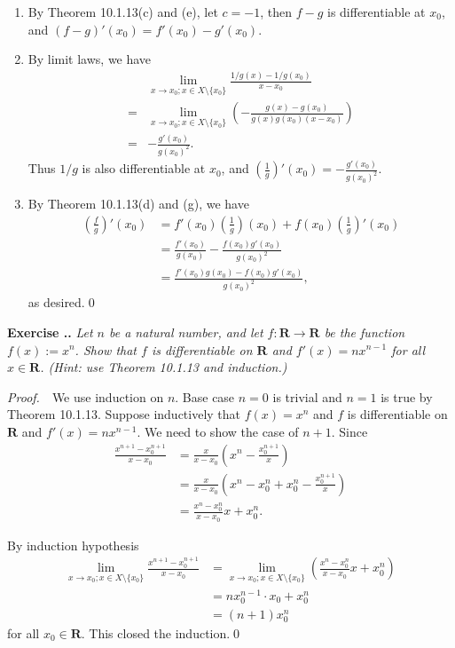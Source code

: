 \documentclass{book}
\newcommand{\pff}{\vspace{.25em}\noindent\emph{Proof.}~~}
\newcounter{Exercise}[section]
\renewcommand{\theExercise}{\thesection.\arabic{Exercise}.}
\newcommand{\new}{\vspace{1.5em}\noindent\textbf{{Exercise \stepcounter{Exercise}\textbf{\theExercise}}} }
\begin{document}
\begin{enumerate}
    \item By Theorem 10.1.13(c) and (e), let $c=-1$, then $f-g$ is differentiable at $x_0$, and $(f-g)'(x_0)=f'(x_0)-g'(x_0)$.
    
    \item By limit laws, we have
        \begin{align*}
            &\lim_{x\to x_0;x\in X\setminus\{x_0\}}\frac{1/g(x)-1/g(x_0)}{x-x_0}\\
            =&\lim_{x\to x_0;x\in X\setminus\{x_0\}}\left(-\frac{g(x)-g(x_0)}{g(x)g(x_0)(x-x_0)}\right)\\
            =&-\frac{g'(x_0)}{g(x_0)^2}.
        \end{align*}
    Thus $1/g$ is also differentiable at $x_0$, and $(\frac{1}{g})'(x_0)=-\frac{g'(x_0)}{g(x_0)^2}$.

    \item By Theorem 10.1.13(d) and (g), we have
        \begin{align*}
            \left(\frac{f}{g}\right)'(x_0)
            &=f'(x_0)\left(\frac{1}{g}\right)(x_0)+f(x_0)\left(\frac{1}{g}\right)'(x_0)\\
            &=\frac{f'(x_0)}{g(x_0)}-\frac{f(x_0)g'(x_0)}{g(x_0)^2}\\
            &=\frac{f'(x_0)g(x_0)-f(x_0)g'(x_0)}{g(x_0)^2},
        \end{align*}
    as desired.\qed
\end{enumerate}

\new\emph{Let $n$ be a natural number, and let $f:\mathbf{R}\to\mathbf{R}$ be the function $f(x):=x^n$. Show that $f$ is differentiable on $\mathbf{R}$ and $f'(x)=nx^{n-1}$ for all $x\in\mathbf{R}$. (Hint: use Theorem 10.1.13 and induction.)}

\pff We use induction on $n$. Base case $n=0$ is trivial and $n=1$ is true by Theorem 10.1.13. Suppose inductively that $f(x)=x^{n}$ and $f$ is differentiable on $\mathbf{R}$ and $f'(x)=nx^{n-1}$. We need to show the case of $n+1$. Since
    \begin{align*}
        \frac{x^{n+1}-x_0^{n+1}}{x-x_0}
        &=\frac{x}{x-x_0}\left(x^n-\frac{x_0^{n+1}}{x}\right)\\
        &=\frac{x}{x-x_0}\left(x^n-x_0^n+x_0^n-\frac{x_0^{n+1}}{x}\right)\\
        &=\frac{x^n-x_0^n}{x-x_0}x+x_0^n.
    \end{align*}

By induction hypothesis
    \begin{align*}
        \lim_{x\to x_0;x\in X\setminus\{x_0\}}\frac{x^{n+1}-x_0^{n+1}}{x-x_0}
        &=\lim_{x\to x_0;x\in X\setminus\{x_0\}}\left(\frac{x^n-x_0^n}{x-x_0}x+x_0^n\right)\\
        &=nx_0^{n-1}\cdot x_0+x_0^n\\
        &=(n+1)x_0^n
    \end{align*}
for all $x_0\in\mathbf{R}$. This closed the induction.\qed
\end{document}
